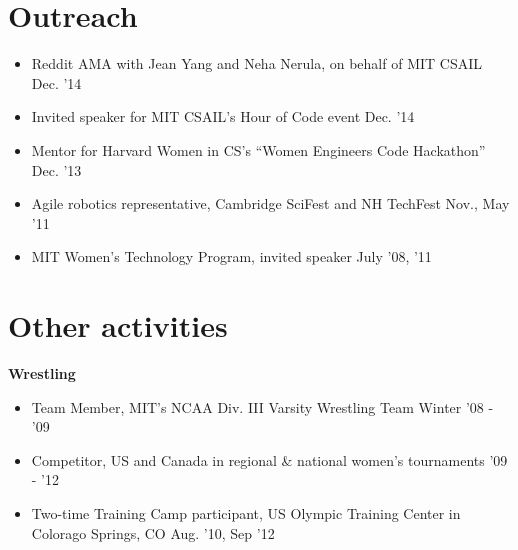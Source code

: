 \documentclass[margin]{res}
\begin{document}
\begin{resume}
\section{Outreach}
\begin{itemize}[leftmargin=*] \itemsep -2pt
\item Reddit AMA with Jean Yang and Neha Nerula, on behalf of MIT CSAIL \hfill Dec. '14
\item Invited speaker for MIT CSAIL's Hour of Code event \hfill Dec. '14
\item Mentor for Harvard Women in CS's ``Women Engineers Code Hackathon'' \hfill Dec. '13
\item Agile robotics representative, Cambridge SciFest and NH TechFest \hfill Nov., May '11
\item MIT Women's Technology Program, invited speaker \hfill July '08, '11 \\
\end{itemize}

\section{Other activities}
{\bf Wrestling}
\begin{itemize}[leftmargin=*] \itemsep -2pt
\item Team Member, MIT's NCAA Div. III Varsity Wrestling Team \hfill Winter '08 - '09
\item Competitor, US and Canada in regional \& national women's tournaments \hfill '09 - '12
\item Two-time Training Camp participant, US Olympic Training Center in Colorago Springs, CO \hfill Aug. '10, Sep '12


\end{itemize}

\end{resume} 
 
\end{document}
